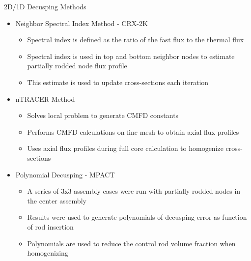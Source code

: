 \begin{frame}[t]{2D/1D Decusping Methods}
    
    \begin{itemize}
        \item Neighbor Spectral Index Method - CRX-2K 
        \cite{cho2015CRX2d1dFusionDecusping}
        \begin{itemize}
          \item Spectral index is defined as the ratio of the fast flux to the 
          thermal flux
          \item Spectral index is used in top and bottom neighbor nodes to 
          estimate partially rodded node flux profile
          \item This estimate is used to update cross-sections 
          each iteration
        \end{itemize}
        \item nTRACER Method \cite{ICAPPcontrolRodDecuspingNTRACER}
        \begin{itemize}
          \item Solves local problem to generate CMFD constants
          \item Performs CMFD calculations on fine mesh to obtain axial flux 
          profiles
          \item Uses axial flux profiles during full core calculation to 
          homogenize cross-sections
        \end{itemize}
        \item Polynomial Decusping - MPACT \cite{MC2015_VCS_Cycle_Depletion}
        \begin{itemize}
          \item A series of 3x3 assembly cases were run with partially rodded 
          nodes in the center assembly
          \item Results were used to generate polynomials of decusping error as 
          function of rod insertion
          \item Polynomials are used to reduce the control rod volume fraction 
          when homogenizing
        \end{itemize}
    \end{itemize}
    
\end{frame}


